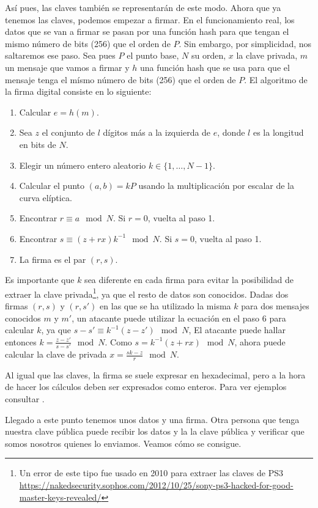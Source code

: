 \documentclass[twoside]{article}
\theoremstyle{definition}
\begin{document}
Así pues, las claves también se representarán de este modo. Ahora que ya tenemos las claves, podemos empezar a firmar. En el funcionamiento real, los datos que se van a firmar se pasan por una función hash para que tengan el mismo número de bits (256) que el orden de $P$. Sin embargo, por simplicidad, nos saltaremos ese paso. Sea pues $P$ el punto base, $N$ su orden, $x$ la clave privada, $m$ un mensaje que vamos a firmar y $h$ una función hash que se usa para que el mensaje tenga el mísmo número de bits (256) que el orden de $P$. El algoritmo de la firma digital consiste en lo siguiente:
\begin{enumerate}
\item Calcular $e=h(m)$.
\item Sea $z$ el conjunto de $l$ dígitos más a la izquierda de $e$, donde $l$ es la longitud en bits de $N$.
\item Elegir un número entero aleatorio $k\in\{1,\dots,N-1\}$.
\item Calcular el punto $(a,b)=kP$ usando la multiplicación por escalar de la curva elíptica. 
\item Encontrar $r\equiv a\mod N$. Si $r=0$, vuelta al paso 1.
\item Encontrar $s\equiv (z+rx)k^{-1}\mod N$. Si $s=0$, vuelta al paso 1. 
\item La firma es el par $(r,s)$. 
\end{enumerate}

Es importante que $k$ sea diferente en cada firma para evitar la posibilidad de extraer la clave privada\footnote{Un error de este tipo fue usado en 2010 para extraer las claves de PS3 \url{https://nakedsecurity.sophos.com/2012/10/25/sony-ps3-hacked-for-good-master-keys-revealed/}}, ya que el resto de datos son conocidos. Dadas dos firmas $(r,s)$ y $(r,s')$ en las que se ha utilizado la misma $k$ para dos mensajes conocidos $m$ y $m'$, un atacante puede utilizar la ecuación en el paso 6 para calcular $k$, ya que $s-s'\equiv k^{-1}(z-z')\mod N$, El atacante puede hallar entonces $k=\frac{z-z'}{s-s'}\mod N$. Como $s=k^{-1}(z+rx)\mod N$, ahora puede calcular la clave de privada $x=\frac{sk-z}{r}\mod N$. 

Al igual que las claves, la firma se suele expresar en hexadecimal, pero a la hora de hacer los cálculos deben ser expresados como enteros. Para ver ejemplos consultar \cite{Eric}.

Llegado a este punto tenemos unos datos y una firma. Otra persona que tenga nuestra clave pública puede recibir los datos y la la clave pública y verificar que somos nosotros quienes lo enviamos. Veamos cómo se consigue.
\end{document}
